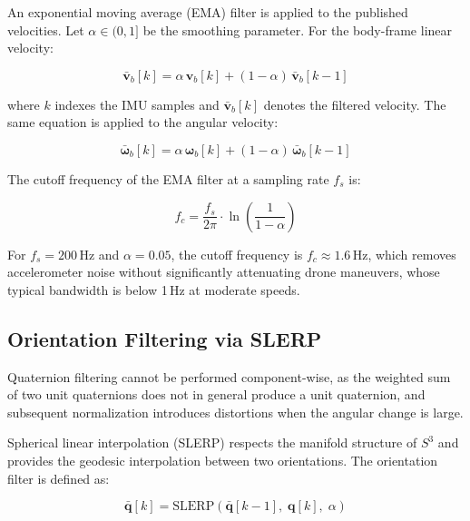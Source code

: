 An exponential moving average (EMA) filter is applied to the published velocities.
Let $\alpha \in (0, 1]$ be the smoothing parameter. For the body-frame linear
velocity:

\begin{equation}
    \bar{\mathbf{v}}_b[k] = \alpha \, \mathbf{v}_b[k]
        + (1 - \alpha) \, \bar{\mathbf{v}}_b[k-1]
    \label{eq:fr-ema-vel}
\end{equation}

where $k$ indexes the IMU samples and $\bar{\mathbf{v}}_b[k]$ denotes the filtered
velocity. The same equation is applied to the angular velocity:

\begin{equation}
    \bar{\boldsymbol{\omega}}_b[k] = \alpha \, \boldsymbol{\omega}_b[k]
        + (1 - \alpha) \, \bar{\boldsymbol{\omega}}_b[k-1]
    \label{eq:fr-ema-omega}
\end{equation}

The cutoff frequency of the EMA filter at a sampling rate $f_s$ is:

\begin{equation}
    f_c = \frac{f_s}{2\pi} \cdot \ln\!\left(\frac{1}{1 - \alpha}\right)
    \label{eq:fr-cutoff}
\end{equation}

For $f_s = 200$\,Hz and $\alpha = 0.05$, the cutoff frequency is
$f_c \approx 1.6$\,Hz, which removes accelerometer noise without significantly
attenuating drone maneuvers, whose typical bandwidth is below 1\,Hz at moderate
speeds.

\subsection{Orientation Filtering via SLERP}
\label{sec:fr-slerp}

Quaternion filtering cannot be performed component-wise, as the weighted sum of two
unit quaternions does not in general produce a unit quaternion, and subsequent
normalization introduces distortions when the angular change is large.

Spherical linear interpolation (SLERP) respects the manifold structure of $S^3$
and provides the geodesic interpolation between two orientations. The orientation
filter is defined as:

\begin{equation}
    \bar{\mathbf{q}}[k] = \mathrm{SLERP}\!\left(\bar{\mathbf{q}}[k-1],\;
        \mathbf{q}[k],\; \alpha\right)
    \label{eq:fr-slerp}
\end{equation}

